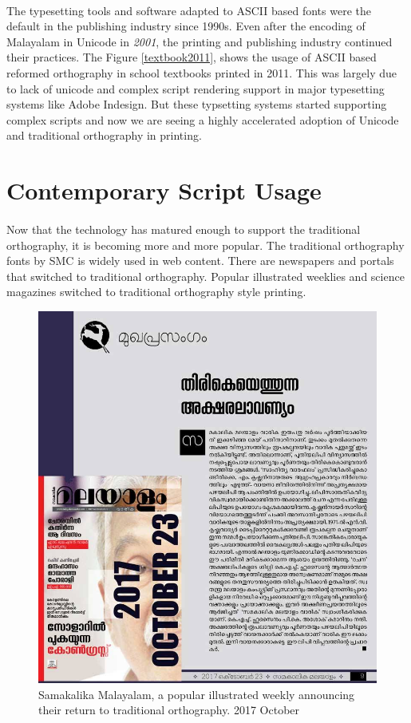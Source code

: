 \documentclass[10pt]{article}
\begin{document}
\paragraph{}
The typesetting tools and software adapted to ASCII based fonts were the default in the publishing industry since 1990s. Even after the encoding of Malayalam in Unicode in \textit{2001}, the printing and publishing industry continued their practices. The Figure \ref{textbook2011}, shows the usage of ASCII based reformed orthography in school textbooks printed in 2011. This was largely due to lack of unicode and complex script rendering support in major typesetting systems like Adobe Indesign. But these typsetting systems started supporting complex scripts and now we are seeing a highly accelerated adoption of Unicode and traditional orthography in printing.

\section{Contemporary Script Usage}
\paragraph{}
Now that the technology has matured enough to support the traditional orthography, it is becoming more and more popular. The traditional orthography fonts by SMC is widely used in web content. There are newspapers and portals that switched to traditional orthography. Popular illustrated weeklies and science magazines switched to traditional orthography style printing. 

\begin{figure}[H]
	\centering
	\includegraphics[scale=0.4]{images/samakalikamalayalam.jpg}
	\caption{Samakalika Malayalam, a popular illustrated weekly announcing their return to traditional orthography. 2017 October}
\end{figure}
\end{document}
